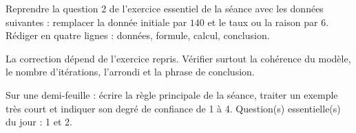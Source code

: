 
    \begin{homework}Reprendre la question 2 de l'exercice essentiel de la séance avec les données suivantes : remplacer la donnée initiale par $140$ et le taux ou la raison par $6$. Rédiger en quatre lignes : données, formule, calcul, conclusion.\end{homework}
    \begin{solution}La correction dépend de l'exercice repris. Vérifier surtout la cohérence du modèle, le nombre d'itérations, l'arrondi et la phrase de conclusion.\end{solution}

    \begin{exitticket}[3 minutes]Sur une demi-feuille : écrire la règle principale de la séance, traiter un exemple très court et indiquer son degré de confiance de 1 à 4. Question(s) essentielle(s) du jour : 1 et 2.\end{exitticket}

